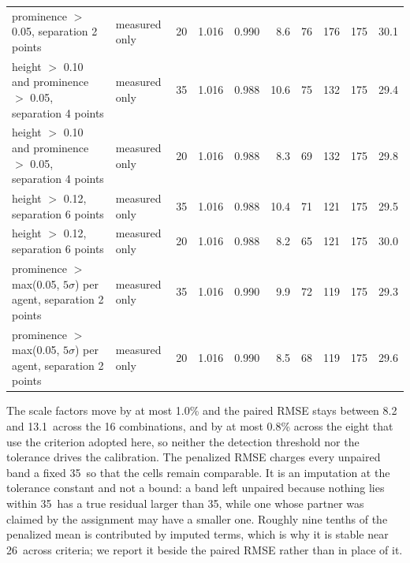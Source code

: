 \begin{table}[htbp]
{\begin{tabular}{llrrrrrrrr}
prominence $>$ 0.05, separation 2 points & measured only & 20 & 1.016 & 0.990 & 8.6 & 76 & 176 & 175 & 30.1 \\
height $>$ 0.10 and prominence $>$ 0.05, separation 4 points & measured only & 35 & 1.016 & 0.988 & 10.6 & 75 & 132 & 175 & 29.4 \\
height $>$ 0.10 and prominence $>$ 0.05, separation 4 points & measured only & 20 & 1.016 & 0.988 & 8.3 & 69 & 132 & 175 & 29.8 \\
height $>$ 0.12, separation 6 points & measured only & 35 & 1.016 & 0.988 & 10.4 & 71 & 121 & 175 & 29.5 \\
height $>$ 0.12, separation 6 points & measured only & 20 & 1.016 & 0.988 & 8.2 & 65 & 121 & 175 & 30.0 \\
prominence $>$ max(0.05, $5\sigma$) per agent, separation 2 points & measured only & 35 & 1.016 & 0.990 & 9.9 & 72 & 119 & 175 & 29.3 \\
prominence $>$ max(0.05, $5\sigma$) per agent, separation 2 points & measured only & 20 & 1.016 & 0.990 & 8.5 & 68 & 119 & 175 & 29.6 \\
\bottomrule
\end{tabular}
}

\begin{flushleft}\footnotesize The scale factors move by at most 1.0\% and the paired RMSE stays between 8.2 and 13.1\,\wn{} across the 16 combinations, and by at most 0.8\% across the eight that use the criterion adopted here, so neither the detection threshold nor the tolerance drives the calibration. The penalized RMSE charges every unpaired band a fixed 35\,\wn{} so that the cells remain comparable. It is an imputation at the tolerance constant and not a bound: a band left unpaired because nothing lies within 35\,\wn{} has a true residual larger than 35, while one whose partner was claimed by the assignment may have a smaller one. Roughly nine tenths of the penalized mean is contributed by imputed terms, which is why it is stable near 26\,\wn{} across criteria; we report it beside the paired RMSE rather than in place of it.\end{flushleft}
\end{table}
